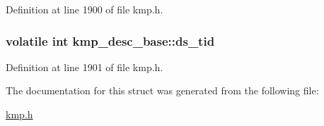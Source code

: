 Definition at line 1900 of file kmp.\-h.

\hypertarget{structkmp__desc__base_abc0ecc8ce19cd714e5c888c4383fb287}{
\subsubsection[{ds\-\_\-tid}]{\setlength{\rightskip}{0pt plus 5cm}volatile {\bf int} kmp\-\_\-desc\-\_\-base\-::ds\-\_\-tid}}\label{structkmp__desc__base_abc0ecc8ce19cd714e5c888c4383fb287}


Definition at line 1901 of file kmp.\-h.



The documentation for this struct was generated from the following file\-:\begin{DoxyCompactItemize}
\item 
\hyperlink{kmp_8h}{kmp.\-h}\end{DoxyCompactItemize}
